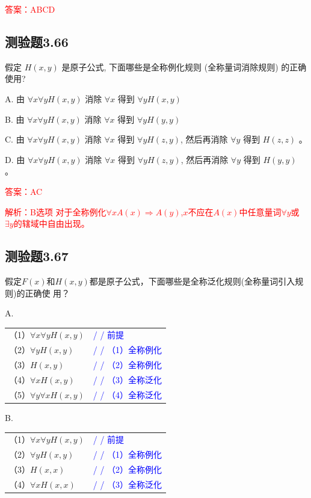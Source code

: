 \documentclass[UTF8, heading=true]{ctexart}
\begin{document}
\textcolor{red}{答案：ABCD}


\subsection{测验题3.66}

假定 $H(x, y)$ 是原子公式, 下面哪些是全称例化规则 (全称量词消除规则) 的正确使用?

A. 由 $\forall x \forall y H(x, y)$ 消除 $\forall x$ 得到 $\forall y H(x, y)$

B. 由 $\forall x \forall y H(x, y)$ 消除 $\forall x$ 得到 $\forall y H(y, y)$

C. 由 $\forall x \forall y H(x, y)$ 消除 $\forall x$ 得到 $\forall y H(z, y)$, 然后再消除 $\forall y$ 得到 $H(z, z)$ 。

D. 由 $\forall x \forall y H(x, y)$ 消除 $\forall x$ 得到 $\forall y H(z, y)$, 然后再消除 $\forall y$ 得到 $H(y, y)$ 。


\textcolor{red}{答案：AC}

\textcolor{red}{解析：B选项 对于全称例化$\forall x A(x) \Longrightarrow A(y)$,$x$不应在$A(x)$中任意量词$\forall y$或$\exists y$的辖域中自由出现。}


\subsection{测验题3.67}
假定$F(x)$和$H(x,y)$都是原子公式，下面哪些是全称泛化规则(全称量词引入规则)的正确使
用？


A. 

\begin{tabular}{ll}
  （1）$\forall x \forall y H(x, y)$ & \textcolor{blue}{/ / 前提} \\
  （2）$\forall y H(x, y)$ & \textcolor{blue}{/ / （1）全称例化} \\
  （3）$H(x, y)$ & \textcolor{blue}{/ / （2）全称例化} \\
  （4）$\forall x H(x, y)$ & \textcolor{blue}{/ / （3）全称泛化} \\
  （5）$\forall y \forall x H(x, y)$ & \textcolor{blue}{/ / （4）全称泛化}
\end{tabular}


B. 

\begin{tabular}{ll}
  （1）$\forall x \forall y H(x, y)$ & \textcolor{blue}{/ / 前提} \\
  （2）$\forall y H(x, y)$ & \textcolor{blue}{/ / （1）全称例化} \\
  （3）$H(x, x)$ & \textcolor{blue}{/ / （2）全称例化} \\
  （4）$\forall x H(x, x)$ & \textcolor{blue}{/ / （3）全称泛化}
\end{tabular}
\end{document}
